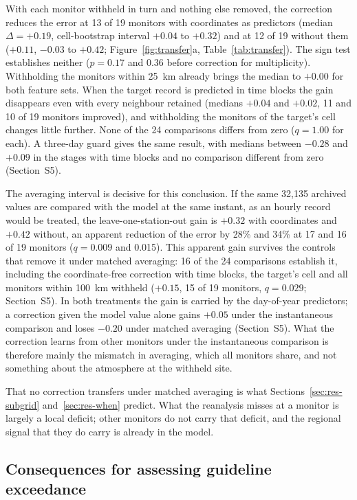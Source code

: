 With each monitor withheld in turn and nothing else removed, the correction reduces the error at
13 of 19 monitors with coordinates as predictors (median $\Delta=+0.19$, cell-bootstrap interval
$+0.04$ to $+0.32$) and at 12 of 19 without them ($+0.11$, $-0.03$ to $+0.42$;
Figure~\ref{fig:transfer}a, Table~\ref{tab:transfer}). The sign test establishes neither
($p=0.17$ and 0.36 before correction for multiplicity). Withholding the monitors within 25~km
already brings the median to $+0.00$ for both feature sets. When the target record is predicted
in time blocks the gain disappears even with every neighbour retained (medians $+0.04$ and
$+0.02$, 11 and 10 of 19 monitors improved), and withholding the monitors of the target's cell
changes little further. None of the 24 comparisons differs from zero ($q=1.00$ for each). A
three-day guard gives the same result, with medians between $-0.28$ and $+0.09$ in the stages
with time blocks and no comparison different from zero (Section~S5).

The averaging interval is decisive for this conclusion. If the same 32,135 archived values are
compared with the model at the same instant, as an hourly record would be treated, the
leave-one-station-out gain is $+0.32$ with coordinates and $+0.42$ without, an apparent reduction
of the error by 28\% and 34\% at 17 and 16 of 19 monitors ($q=0.009$ and 0.015). This apparent
gain survives the controls that remove it under matched averaging: 16 of the 24 comparisons
establish it, including the coordinate-free correction with time blocks, the target's cell and
all monitors within 100~km withheld ($+0.15$, 15 of 19 monitors, $q=0.029$; Section~S5). In both
treatments the gain is carried by the day-of-year predictors; a correction given the model value
alone gains $+0.05$ under the instantaneous comparison and loses $-0.20$ under matched averaging
(Section~S5). What the correction learns from other monitors under the instantaneous comparison
is therefore mainly the mismatch in averaging, which all monitors share, and not something about
the atmosphere at the withheld site.

That no correction transfers under matched averaging is what Sections~\ref{sec:res-subgrid}
and~\ref{sec:res-when} predict. What the reanalysis misses at a monitor is largely a local deficit;
other monitors do not carry that deficit, and the regional signal that they do carry is already
in the model.

\subsection{Consequences for assessing guideline exceedance}
\label{sec:res-exceed}

